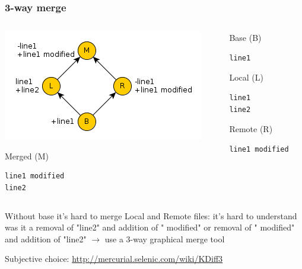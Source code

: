 \documentclass{beamer}
\begin{document}
\begin{frame}[fragile]
\frametitle{3-way merge}
\begin{columns}[b]
\begin{column}{0.45\textwidth}
\includegraphics[width=\textwidth]{img/3way_merge}

\begin{exampleblock}{Merged (M)}
\begin{verbatim}
line1 modified
line2
\end{verbatim}
\end{exampleblock}

\end{column}
\begin{column}{0.45\textwidth}
\begin{exampleblock}{Base (B)}
\begin{verbatim}
line1
\end{verbatim}
\end{exampleblock}

\begin{exampleblock}{Local (L)}
\begin{verbatim}
line1
line2
\end{verbatim}
\end{exampleblock}

\begin{exampleblock}{Remote (R)}
\begin{verbatim}
line1 modified
\end{verbatim}
\end{exampleblock}

\end{column}
\end{columns}

Without base it's hard to merge Local and Remote files: it's hard to understand was it a removal of "line2" and addition of " modified" or removal of " modified" and addition of "line2" $\to$ use a 3-way graphical merge tool

Subjective choice: \url{http://mercurial.selenic.com/wiki/KDiff3}

\end{frame}
\end{document}
